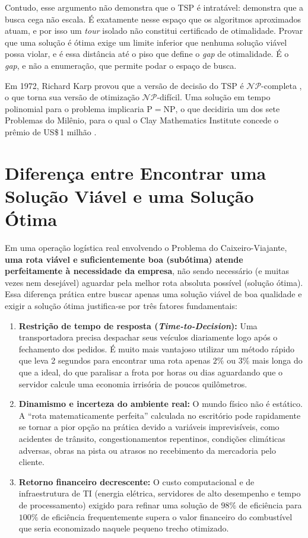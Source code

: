 Contudo, esse argumento não demonstra que o TSP é intratável: demonstra que
a busca cega não escala. É exatamente nesse espaço que os algoritmos
aproximados atuam, e por isso um \textit{tour} isolado não constitui
certificado de otimalidade. Provar que uma solução é ótima exige um limite
inferior que nenhuma solução viável possa violar, e é essa distância até o
piso que define o \emph{gap} de otimalidade. É o \emph{gap}, e não a
enumeração, que permite podar o espaço de busca.

Em 1972, Richard Karp provou que a versão de decisão do TSP é
$\mathcal{NP}$-completa \cite{karp1972}, o que torna sua versão de
otimização $\mathcal{NP}$-difícil. Uma solução em tempo polinomial para o
problema implicaria $\mathrm{P} = \mathrm{NP}$, o que decidiria um dos sete
Problemas do Milênio, para o qual o Clay Mathematics Institute concede o
prêmio de US\$\,1 milhão \cite{cook2000}.

\section{Diferença entre Encontrar uma Solução Viável e uma Solução Ótima}

Em uma operação logística real envolvendo o Problema do Caixeiro-Viajante, \textbf{uma rota viável e suficientemente boa (subótima) atende perfeitamente à necessidade da empresa}, não sendo necessário (e muitas vezes nem desejável) aguardar pela melhor rota absoluta possível (solução ótima). Essa diferença prática entre buscar apenas uma solução viável de boa qualidade e exigir a solução ótima justifica-se por três fatores fundamentais:

\begin{enumerate}
		\item \textbf{Restrição de tempo de resposta (\textit{Time-to-Decision}):} Uma transportadora precisa despachar seus veículos diariamente logo após o fechamento dos pedidos. É muito mais vantajoso utilizar um método rápido que leva 2 segundos para encontrar uma rota apenas $2\%$ ou $3\%$ mais longa do que a ideal, do que paralisar a frota por horas ou dias aguardando que o servidor calcule uma economia irrisória de poucos quilômetros.
		\item \textbf{Dinamismo e incerteza do ambiente real:} O mundo físico não é estático. A ``rota matematicamente perfeita'' calculada no escritório pode rapidamente se tornar a pior opção na prática devido a variáveis imprevisíveis, como acidentes de trânsito, congestionamentos repentinos, condições climáticas adversas, obras na pista ou atrasos no recebimento da mercadoria pelo cliente.
		\item \textbf{Retorno financeiro decrescente:} O custo computacional e de infraestrutura de TI (energia elétrica, servidores de alto desempenho e tempo de processamento) exigido para refinar uma solução de $98\%$ de eficiência para $100\%$ de eficiência frequentemente supera o valor financeiro do combustível que seria economizado naquele pequeno trecho otimizado.
\end{enumerate}

